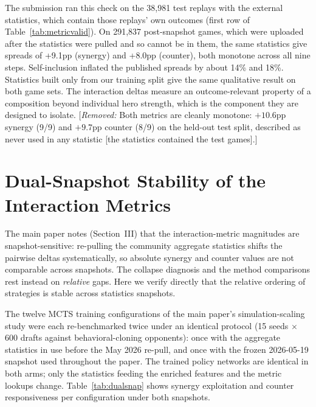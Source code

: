 \documentclass[journal]{IEEEtran}
\newcommand{\added}[1]{{\color{blue}#1}}
\newcommand{\removed}[1]{{\color{red}[\textit{Removed:} #1]}}
\newcommand{\added}[1]{#1}
\newcommand{\removed}[1]{}
\begin{document}
\added{The submission ran this check on the 38,981 test replays with the external statistics, which contain those replays' own outcomes (first row of Table~\ref{tab:metricvalid}). On 291,837 post-snapshot games, which were uploaded after the statistics were pulled and so cannot be in them, the same statistics give spreads of +9.1pp (synergy) and +8.0pp (counter), both monotone across all nine steps. Self-inclusion inflated the published spreads by about 14\% and 18\%. Statistics built only from our training split give the same qualitative result on both game sets. The interaction deltas measure an outcome-relevant property of a composition beyond individual hero strength, which is the component they are designed to isolate.} \removed{Both metrics are cleanly monotone: $+10.6$pp synergy (9/9) and $+9.7$pp counter (8/9) on the held-out test split, described as never used in any statistic [the statistics contained the test games].}

\section{Dual-Snapshot Stability of the Interaction Metrics}
\label{sec:dualsnap}

The main paper notes (Section~III) that the interaction-metric magnitudes are snapshot-sensitive: re-pulling the community aggregate statistics shifts the pairwise deltas systematically, so absolute synergy and counter values are not comparable across snapshots. The collapse diagnosis and the method comparisons rest instead on \textit{relative} gaps. Here we verify directly that the relative ordering of strategies is stable across statistics snapshots.

The twelve MCTS training configurations of the main paper's simulation-scaling study were each re-benchmarked twice under an identical protocol (15 seeds $\times$ 600 drafts against behavioral-cloning opponents): once with the aggregate statistics in use before the May 2026 re-pull, and once with the frozen 2026-05-19 snapshot used throughout the paper. The trained policy networks are identical in both arms; only the statistics feeding the enriched features and the metric lookups change. Table~\ref{tab:dualsnap} shows synergy exploitation and counter responsiveness per configuration under both snapshots.
\end{document}
